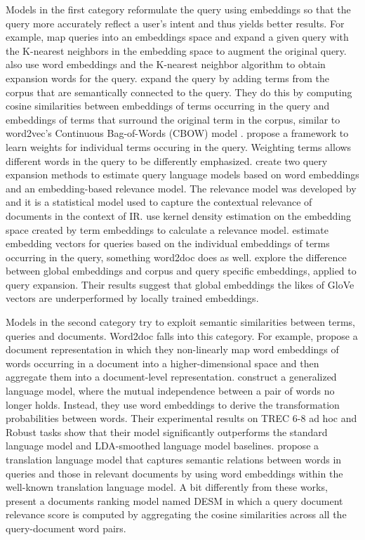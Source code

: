 Models in the first category reformulate the query using embeddings so that the query more accurately reflect a user’s intent and thus
yields better results. For example, \citet{grbovic2015} map queries into an embeddings space and expand a given query with the K-nearest
neighbors in the embedding space to augment the original query. \citet{roy2016} also use word embeddings and the K-nearest neighbor
algorithm to obtain expansion words for the query. \citet{kuzi2016} expand the query by adding terms from the corpus that are
semantically connected to the query. They do this by computing cosine similarities between embeddings of terms occurring in the
query and embeddings of terms that surround the original term in the corpus, similar to word2vec's Continuous Bag-of-Words (CBOW)
model \citep{word2vec}. \citet{zheng2015} propose a framework to learn weights for individual terms occuring in the query.
Weighting terms allows different words in the query to be differently emphasized. \citet{zamani2016} create two query expansion methods to
estimate query language models based on word embeddings and an embedding-based relevance model. The relevance model was developed by
\citet{lavrenko2001} and it is a statistical model used to capture the contextual relevance of documents in the context of IR.
\citet{roy2016b} use kernel density estimation on the embedding space created by term embeddings to calculate a relevance model.
\citet{zamani2016b} estimate embedding vectors for queries based on the individual embeddings of terms occurring in the
query, something word2doc does as well. \citet{diaz2016} explore the difference between global embeddings and corpus and query
specific embeddings, applied to query expansion. Their results suggest that global embeddings the likes of GloVe vectors
\citep{glove} are underperformed by locally trained embeddings.

Models in the second category try to exploit semantic similarities between terms, queries and documents.
Word2doc falls into this category. For example, \citet{clinchant2013} propose a document representation in which they
non-linearly map word embeddings of words occurring in a document into a higher-dimensional space and then aggregate them into
a document-level representation. \citet{ganguly2015} construct a generalized language model, where the mutual independence between
a pair of words no longer holds. Instead, they use word embeddings to derive the transformation probabilities between words. Their
experimental results on TREC 6-8 ad hoc and Robust tasks show that their model significantly outperforms the standard language
model and LDA-smoothed language model baselines. \citet{zuccon2015} propose a translation language model that captures semantic
relations between words in queries and those in relevant documents by using word embeddings within the well-known translation
language model. A bit differently from these works, \citet{mitra2016} present a documents ranking model named DESM in which a
query document relevance score is computed by aggregating the cosine similarities across all the query-document word pairs.

